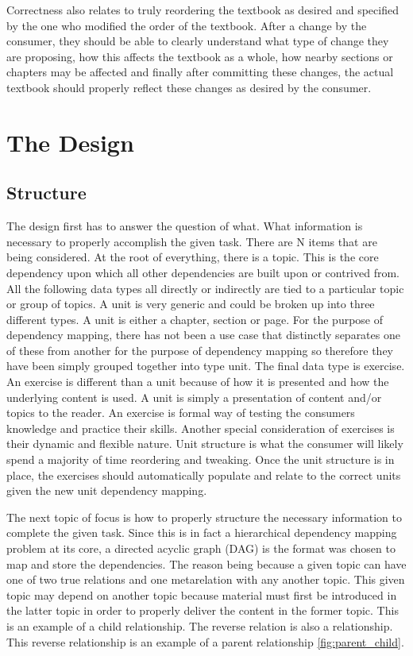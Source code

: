 Correctness also relates to truly reordering the textbook as desired and specified by the one who modified the order of the textbook. After a change by the consumer, they should be able to clearly understand what type of change they are proposing, how this affects the textbook as a whole, how nearby sections or chapters may be affected and finally after committing these changes, the actual textbook should properly reflect these changes as desired by the consumer. 

\cite{bile}
\cite{tsur}
\cite{reactReconcile}

\section{The Design}

\subsection{Structure}

The design first has to answer the question of what. What information is necessary  to properly accomplish the given task. There are N items that are being considered. At the root of everything, there is a topic. This is the core dependency upon which all other dependencies are built upon or contrived from. All the following data types all directly or indirectly are tied to a particular topic or group of topics. A unit is very generic and could be broken up into three different types. A unit is either a chapter, section or page. For the purpose of dependency mapping, there has not been a use case that distinctly separates one of these from another for the purpose of dependency mapping so therefore they have been simply grouped together into type unit. The final data type is exercise. An exercise is different than a unit because of how it is presented and how the underlying content is used. A unit is simply a presentation of content and/or topics to the reader. An exercise is formal way of testing the consumers knowledge and practice their skills. Another special consideration of exercises is their dynamic and flexible nature. Unit structure is what the consumer will likely spend a majority of time reordering and tweaking. Once the unit structure is in place, the exercises should automatically populate and relate to the correct units given the new unit dependency mapping.

The next topic of focus is how to properly structure the necessary information to complete the given task. Since this is in fact a hierarchical dependency mapping problem at its core, a directed acyclic graph (DAG) is the format was chosen to map and store the dependencies. The reason being because a given topic can have one of two true relations and one metarelation with any another topic. This given topic may depend on another topic because material must first be introduced in the latter topic in order to properly deliver the content in the former topic. This is an example of a child relationship. The reverse relation is also a relationship. This reverse relationship is an example of a parent relationship \ref{fig:parent_child}.

